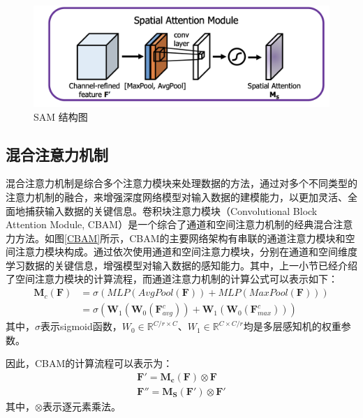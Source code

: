 \begin{figure}[h]
    \centering
    \includegraphics[width=14cm]{pic/chapter3/SAM.png}
    \caption{SAM 结构图}
    \label{SAM}
\end{figure}
\subsection{混合注意力机制}
混合注意力机制是综合多个注意力模块来处理数据的方法，通过对多个不同类型的注意力机制的融合，来增强深度网络模型对输入数据的建模能力，以更加灵活、全面地捕获输入数据的关键信息。卷积块注意力模块（Convolutional Block Attention Module, CBAM）是一个综合了通道和空间注意力机制的经典混合注意力方法。如图\ref{CBAM}所示，CBAM的主要网络架构有串联的通道注意力模块和空间注意力模块构成。通过依次使用通道和空间注意力模块，分别在通道和空间维度学习数据的关键信息，增强模型对输入数据的感知能力。其中，上一小节已经介绍了空间注意力模块的计算流程，而通道注意力机制的计算公式可以表示如下：
\begin{equation}
    \begin{aligned}
        \mathbf{M}_c\left( \mathbf{F} \right) & =\sigma \left( MLP\left( AvgPool\left( \mathbf{F} \right) \right) +MLP\left( MaxPool\left( \mathbf{F} \right) \right) \right)
        \\
                                              & =\sigma \left( \mathbf{W}_1\left( \mathbf{W}_0\left( \mathbf{F}_{avg}^{c} \right) \right) +\mathbf{W}_1\left( \mathbf{W}_0\left( \mathbf{F}_{max}^{c} \right) \right) \right)
    \end{aligned}
\end{equation}
其中，$\sigma$表示sigmoid函数，$W_0 \in \mathbb{R}^{C/r\times C}$、$W_1 \in \mathbb{R}^{C\times C/r}$均是多层感知机的权重参数。

因此，CBAM的计算流程可以表示为：
\begin{align}
    \mathbf{F}\prime=\mathbf{M}_{\mathbf{c}}\left( \mathbf{F} \right) \otimes \mathbf{F}
    \\
    \mathbf{F}''=\mathbf{M}_{\mathbf{S}}\left( \mathbf{F}\prime \right) \otimes \mathbf{F}\prime
\end{align}
其中，$\otimes$表示逐元素乘法。

